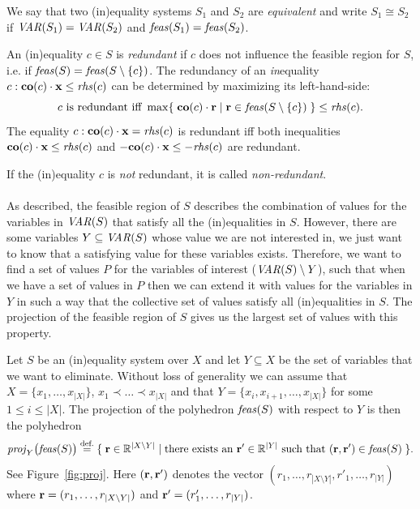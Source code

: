 {We say that two (in)equality systems $S_1$ and $S_2$ are \emph{equivalent} and write $S_1\cong S_2$ if 
$\mathit{VAR}(S_1)=\mathit{VAR}(S_2)$ and $\mathit{feas}(S_1) = \mathit{feas}(S_2)$.}

An (in)equality $c\in S$ is \emph{redundant} if $c$ does not influence the feasible region for $S$, i.e. if $\mathit{feas}(S)=\mathit{feas}(S\setminus\{c\})$. The redundancy of an \emph{in}equality $c: \mathbf{co}(c)\cdot\mathbf{x}\leq \mathit{rhs}(c)$ can be determined by maximizing its left-hand-side:  
\begin{equation}\label{eq:redundant}
c \text{ is redundant iff }\max\{\;{\mathbf{co}(c)\cdot\mathbf{r}}\;|\;{\mathbf{r}\in \mathit{feas}(S\setminus\{c\})}\;\} \leq \mathit{rhs}(c).
\end{equation}
The equality $c: \mathbf{co}(c)\cdot\mathbf{x} = \mathit{rhs}(c)$ 
is redundant iff both inequalities 
$\mathbf{co}(c)\cdot\mathbf{x} \leq \mathit{rhs}(c)$ and $-\mathbf{co}(c)\cdot\mathbf{x} \leq -\mathit{rhs}(c)$ 
are redundant.

If the (in)equality $c$ is \emph{not} redundant, it is called \emph{non-redundant}.
%
\\\\
%
As described, the feasible region of $S$ describes the combination of values for the variables in $\mathit{VAR}(S)$ that satisfy all the (in)equalities in $S$. However, there are some variables $Y\subseteq \mathit{VAR}(S)$ whose value we are not interested in, we just want to know that a satisfying value for these variables exists.  
Therefore, we want to find a set of values $P$ for the variables of interest ($\mathit{VAR}(S)\setminus Y$), such that when we have a set of values in $P$ then we can extend it with values for the variables in $Y$ in such a way that the collective set of values satisfy all (in)equalities in $S$. 
The {projection} of the feasible region of $S$ gives us the largest set of values with this property.

Let $S$ be an (in)equality system over $X$ and let $Y\subseteq X$ be the set of variables that we want to eliminate. Without loss of generality we can assume that $X = \{x_1,\ldots, x_{|X|}\}$, $x_1\prec \ldots \prec x_{|X|}$ and that $Y=\{x_i, x_{i+1}, \ldots, x_{|X|}\}$ for some $1\leq i\leq |X|$.
The {projection} of the polyhedron $\mathit{feas}(S)$ with respect to $Y$ is then the polyhedron 
\[
\mathit{proj}_Y\big(\mathit{feas}(S)\big) \overset{\text{def.}}= \{\;{\mathbf{r}\in\mathbb{R}^{|X\setminus Y|}}\;|\;{\text{there exists an } \mathbf{r}'\in\mathbb{R}^{|Y|}\text{ such that }
(\mathbf{r},\mathbf{r'})\in \mathit{feas}(S)}\;\}.
\]
See Figure~\ref{fig:proj}. Here $(\mathbf{r},\mathbf{r'})$ denotes the vector $(r_1,\ldots, r_{|X\setminus Y|}, r'_1,\ldots, r_{|Y|})$ where $\mathbf{r}=(r_1,\ldots, r_{|X\setminus Y|})$ and $\mathbf{r'}=(r'_1,\ldots, r_{|Y|})$.

